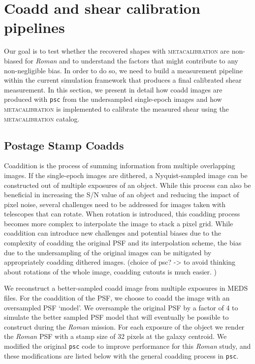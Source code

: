 \documentclass[fleqn,usenatbib]{mnras}
\begin{document}
\section{Coadd and shear calibration pipelines}
\label{sec:methods}
Our goal is to test whether the recovered shapes with \textsc{metacalibration} are non-biased for \emph{Roman} and to understand the factors that might contribute to any non-negligible bias. In order to do so, we need to build a measurement pipeline within the current simulation framework that produces a final calibrated shear measurement. In this section, we present in detail how coadd images are produced with \texttt{psc} from the undersampled single-epoch images and how \textsc{metacalibration} is implemented to calibrate the measured shear using the \textsc{metacalibration} catalog. 


\subsection{Postage Stamp Coadds}
\label{subsec:psc}
Coaddition is the process of summing information from multiple overlapping images. If the single-epoch images are dithered, a Nyquist-sampled image can be constructed out of multiple exposures of an object. While this process can also be beneficial in increasing the S/N value of an object and reducing the impact of pixel noise, several challenges need to be addressed for images taken with telescopes that can rotate. When rotation is introduced, this coadding process becomes more complex to interpolate the image to stack a pixel grid. While coaddition can introduce new challenges and potential biases due to the complexity of coadding the original PSF and its interpolation scheme, the bias due to the undersampling of the original images can be mitigated by appropriately coadding dithered images. (choice of psc? -> to avoid thinking about rotations of the whole image, coadding cutouts is much easier. )

We reconstruct a better-sampled coadd image from multiple exposures in MEDS files. For the coaddition of the PSF, we choose to coadd the image with an oversampled PSF `model'. We oversample the original PSF by a factor of 4 to simulate the better sampled PSF model that will eventually be possible to construct during the \emph{Roman} mission. For each exposure of the object we render the \emph{Roman} PSF with a stamp size of 32 pixels at the galaxy centroid. We modified the original \texttt{psc} code to improve performance for this \emph{Roman} study, and these modifications are listed below with the general coadding process in \texttt{psc}. 
\end{document}
